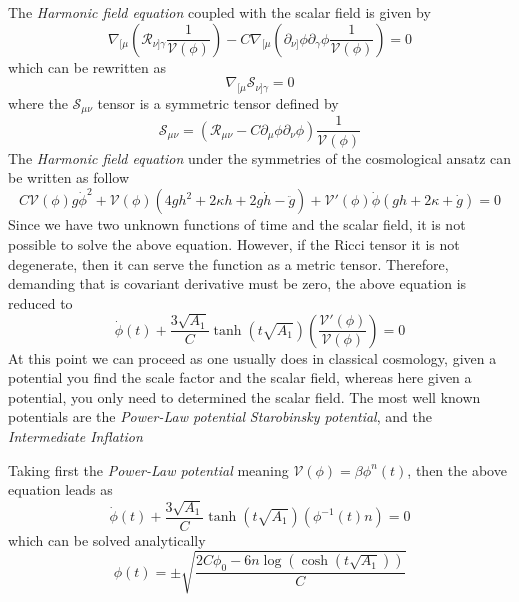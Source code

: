 \documentclass[10pt,a4paper]{article}
\begin{document}
The \textit{Harmonic field equation} coupled with the scalar field is given by
\begin{equation}
  \nabla_{[\mu}\left(\mathcal{R}_{\nu]\gamma}\frac{1}{\mathcal{V}(\phi)}\right) 
  - C \nabla_{[\mu}\left(\partial_{\nu]} \phi \partial_\gamma \phi \frac{1}{\mathcal{V}(\phi)}\right) = 0
\end{equation}
which can be rewritten as
\begin{equation}
  \nabla_{[\mu}\mathcal{S}_{\nu]\gamma} = 0
\end{equation}
where the $\mathcal{S}_{\mu\nu}$ tensor is a symmetric tensor defined by
\begin{equation}
  \mathcal{S}_{\mu\nu} = \left(\mathcal{R}_{\mu\nu} - C \partial_{\mu} \phi \partial_\nu \phi \right)\frac{1}{\mathcal{V}(\phi)}
\end{equation}
The \textit{Harmonic field equation} under the symmetries of the cosmological ansatz can be written as follow
\begin{equation}
  C\mathcal{V}(\phi)g\dot{\phi}^2 + \mathcal{V}(\phi)\left(4gh^2 +2\kappa h + 2g\dot{h} - \ddot{g}\right) +
  \mathcal{V}'(\phi)\dot{\phi}\left(gh + 2\kappa + \dot{g}\right) = 0
\end{equation}
Since we have two unknown functions of time and the scalar field, it is not possible to solve the above equation. However, if the Ricci tensor
it is not degenerate, then it can serve the function as a metric tensor. Therefore, demanding that is covariant derivative must be zero, 
the above equation is reduced to
\begin{equation} 
  \dot{\phi}(t) + \frac{3\sqrt{A_1}}{C}\tanh\left(t\sqrt{A_1}\right)\left(\frac{\mathcal{V}'(\phi)}{\mathcal{V}(\phi)}\right) = 0
\end{equation}
At this point we can proceed as one usually does in classical cosmology, given a potential you find the scale factor and the scalar field, whereas 
here given a potential, you only need to determined the scalar field. The most well known potentials are the \textit{Power-Law potential}
\textit{Starobinsky potential}, and the \textit{Intermediate Inflation}

Taking first the \textit{Power-Law potential} meaning $\mathcal{V}(\phi) = \beta \phi^n(t)$, then the above equation leads as
\begin{equation}
  \dot{\phi}(t) + \frac{3\sqrt{A_1}}{C}\tanh\left(t\sqrt{A_1}\right)\left(\phi^{-1}(t)n\right) = 0
\end{equation}
which can be solved analytically
\begin{equation}
  \phi(t) = \pm \sqrt{\frac{2C\phi_0 - 6n\log(\cosh(t\sqrt{A_1}))}{C} }
\end{equation}
\end{document}

